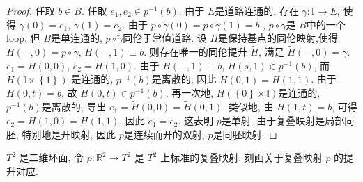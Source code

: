 \documentclass[../main.tex]{subfiles}
\begin{document}
\begin{proof}
 任取 \(  b\in B  \). 任取 \(  e_1,e_2\in p^{-1} \left( b \right)   \). 由于 \(  E  \)是道路连通的, 存在 \(   \tilde{\gamma} : \mathbb{I}\to E  \), 使得 \(   \tilde{\gamma} \left( 0 \right)= e_1   \), \(   \tilde{\gamma} \left( 1 \right)= e_2   \). 由于 \(  p\circ  \tilde{\gamma}   \left( 0 \right)= p\circ  \tilde{\gamma} \left( 1 \right)= b  \)        ,  \(  p\circ  \tilde{\gamma}   \)是 \(  B  \)中的一个loop. 但 \(  B  \)是单连通的, \(  p\circ  \tilde{\gamma}   \)同伦于常值道路. 设 \(  H  \)是保持基点的同伦映射,使得 \(  H\left( -,0 \right)= p\circ  \tilde{\gamma}    \), \(  H\left( -,1 \right)\equiv b   \). 则存在唯一的同伦提升 \(  \tilde{H}  \), 满足 \(  \tilde{H}\left( -,0 \right)=  \tilde{\gamma}    \).   \(  e_1= \tilde{H}\left( 0,0 \right)   \), \(  e_2= \tilde{H}\left( 1,0 \right)   \). 由于 \(  H\left( -,1 \right)\equiv b   \), \(  \tilde{H}\left( s,1 \right)\in  p^{-1} \left( b \right)    \), 而 \(  \tilde{H}\left( \mathbb{I}\times \left\{ 1 \right\} \right)   \)     是连通的, \(  p^{-1} \left( b \right)   \)是离散的, 因此 \(  \tilde{H}\left( 0,1 \right)= \tilde{H}\left( 1,1 \right)    \). 由于\(  H\left( 0,t \right)= b   \), 故 \(  \tilde{H}\left( 0,t \right)\in p ^{-1} \left( b \right)    \), 再一次地, \(  \tilde{H}\left( \left\{ 0 \right\}\times \mathbb{I} \right)   \)是连通的, \(  p^{-1} \left( b \right)   \)是离散的, 导出 \(  e_1= \tilde{H}\left( 0,0 \right)= \tilde{H}\left( 0,1 \right)   \). 类似地, 由 \(  H\left( 1,t \right)= b   \), 可得 \(  e_2= \tilde{H}\left( 1,0 \right)= \tilde{H}\left( 1,1 \right)    \). 因此 \(  e_1= e_2  \). 这表明 \(  p  \)是单射. 由于复叠映射是局部同胚, 特别地是开映射, 因此 \(  p  \)是连续而开的双射, \(  p  \)是同胚映射.          
\end{proof}
\begin{exercise}{}{}
$T^2$ 是二维环面, 令 $p: \mathbb{R}^2 \to T^2$ 是 $T^2$ 上标准的复叠映射. 刻画关于复叠映射 $p$ 的提升对应.
\end{exercise}
\end{document}

